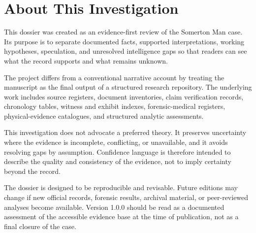 \chapter*{About This Investigation}

This dossier was created as an evidence-first review of the Somerton Man case. Its purpose is to separate documented facts, supported interpretations, working hypotheses, speculation, and unresolved intelligence gaps so that readers can see what the record supports and what remains unknown.

The project differs from a conventional narrative account by treating the manuscript as the final output of a structured research repository. The underlying work includes source registers, document inventories, claim verification records, chronology tables, witness and exhibit indexes, forensic-medical registers, physical-evidence catalogues, and structured analytic assessments.

This investigation does not advocate a preferred theory. It preserves uncertainty where the evidence is incomplete, conflicting, or unavailable, and it avoids resolving gaps by assumption. Confidence language is therefore intended to describe the quality and consistency of the evidence, not to imply certainty beyond the record.

The dossier is designed to be reproducible and revisable. Future editions may change if new official records, forensic results, archival material, or peer-reviewed analyses become available. Version 1.0.0 should be read as a documented assessment of the accessible evidence base at the time of publication, not as a final closure of the case.
